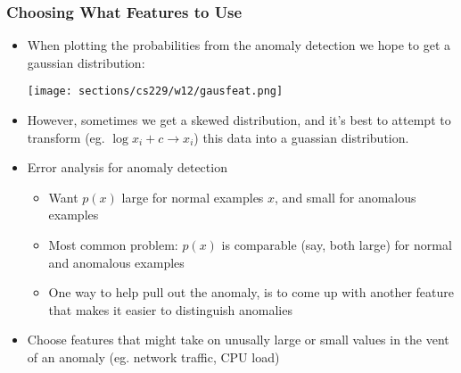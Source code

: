 \subsubsection{Choosing What Features to Use}
\begin{itemize}[--]
	\item When plotting the probabilities from the anomaly detection we hope to get a gaussian distribution:
	\begin{center}
		\texttt{[image: sections/cs229/w12/gausfeat.png]}
	\end{center}
	\item However, sometimes we get a skewed distribution, and it's best to attempt to transform (eg. $\log{x_i + c}\to x_i$) this data into a guassian distribution.
	\item Error analysis for anomaly detection
	\begin{itemize}[--]
	 	\item Want $p(x)$ large for normal examples $x$, and small for anomalous examples
	 	\item Most common problem: $p(x)$ is comparable (say, both large) for normal and anomalous examples
	 	\item One way to help pull out the anomaly, is to come up with another feature that makes it easier to distinguish anomalies 
	 \end{itemize}
	 \item Choose features that might take on unusally large or small values in the vent of an anomaly (eg. network traffic, CPU load)
\end{itemize}

